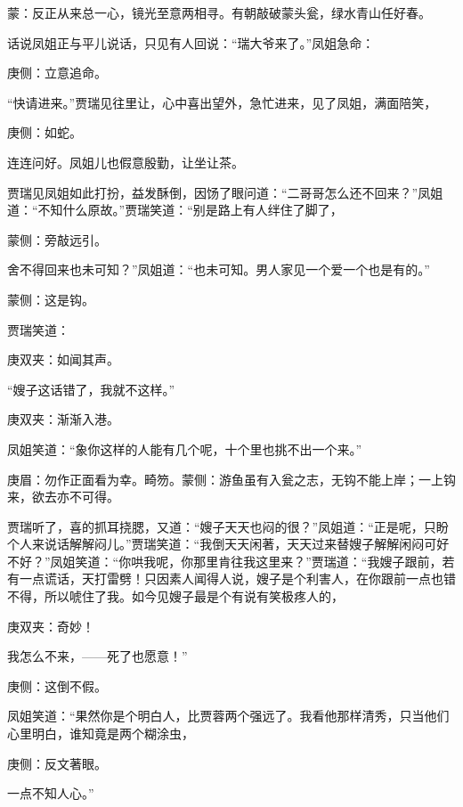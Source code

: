 
\begin{parag}
    \begin{note}蒙：反正从来总一心，镜光至意两相寻。有朝敲破蒙头瓮，绿水青山任好春。\end{note}
\end{parag}


\begin{parag}
    话说凤姐正与平儿说话，只见有人回说：“瑞大爷来了。”凤姐急命：\begin{note}庚侧：立意追命。\end{note}“快请进来。”贾瑞见往里让，心中喜出望外，急忙进来，见了凤姐，满面陪笑，\begin{note}庚侧：如蛇。\end{note}连连问好。凤姐儿也假意殷勤，让坐让茶。
\end{parag}


\begin{parag}
    贾瑞见凤姐如此打扮，益发酥倒，因饧了眼问道：“二哥哥怎么还不回来？”凤姐道：“不知什么原故。”贾瑞笑道：“别是路上有人绊住了脚了，\begin{note}蒙侧：旁敲远引。\end{note}舍不得回来也未可知？”凤姐道：“也未可知。男人家见一个爱一个也是有的。”\begin{note}蒙侧：这是钩。\end{note}贾瑞笑道：\begin{note}庚双夹：如闻其声。\end{note}“嫂子这话错了，我就不这样。”\begin{note}庚双夹：渐渐入港。\end{note}凤姐笑道：“象你这样的人能有几个呢，十个里也挑不出一个来。”\begin{note}庚眉：勿作正面看为幸。畸笏。蒙侧：游鱼虽有入瓮之志，无钩不能上岸；一上钩来，欲去亦不可得。\end{note}贾瑞听了，喜的抓耳挠腮，又道：“嫂子天天也闷的很？”凤姐道：“正是呢，只盼个人来说话解解闷儿。”贾瑞笑道：“我倒天天闲著，天天过来替嫂子解解闲闷可好不好？”凤姐笑道：“你哄我呢，你那里肯往我这里来？”贾瑞道：“我嫂子跟前，若有一点谎话，天打雷劈！只因素人闻得人说，嫂子是个利害人，在你跟前一点也错不得，所以唬住了我。如今见嫂子最是个有说有笑极疼人的，\begin{note}庚双夹：奇妙！\end{note}我怎么不来，——死了也愿意！”\begin{note}庚侧：这倒不假。\end{note}凤姐笑道：“果然你是个明白人，比贾蓉两个强远了。我看他那样清秀，只当他们心里明白，谁知竟是两个糊涂虫，\begin{note}庚侧：反文著眼。\end{note}一点不知人心。”
\end{parag}


